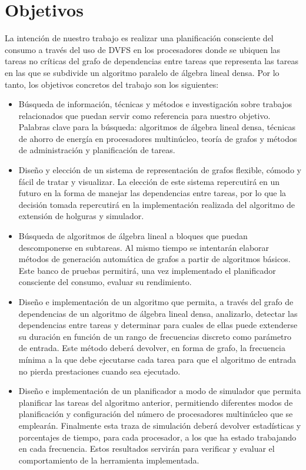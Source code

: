 \section{Objetivos}

La intención de nuestro trabajo es realizar una planificación consciente del consumo
a través del uso de DVFS en los procesadores donde se ubiquen las tareas no 
críticas del grafo de dependencias entre tareas que representa las tareas en las 
que se subdivide un algoritmo paralelo de álgebra lineal densa. Por lo tanto, los objetivos concretos del trabajo 
son los siguientes:

\begin{itemize}

\item Búsqueda de información, técnicas y métodos e investigación sobre trabajos relacionados
que puedan servir como referencia para nuestro objetivo. Palabras clave para la búsqueda: 
algoritmos de álgebra lineal densa, técnicas de ahorro de energía en procesadores multinúcleo, teoría de grafos y
métodos de administración y planificación de tareas.

\item Diseño y elección de un sistema de representación de grafos flexible, cómodo y fácil
de tratar y visualizar. La elección de este sistema repercutirá en un futuro en la forma
de manejar las dependencias entre tareas, por lo que la decisión tomada repercutirá
en la implementación realizada del algoritmo de extensión de holguras y simulador.

\item Búsqueda de algoritmos de álgebra lineal a bloques que puedan descomponerse
en subtareas. Al mismo tiempo se intentarán elaborar métodos de generación automática
de grafos a partir de algoritmos básicos. Este banco de pruebas permitirá, una vez implementado el
planificador consciente del consumo, evaluar su rendimiento.

\item Diseño e implementación de un algoritmo que permita, a través del grafo de dependencias de
un algoritmo de álgebra lineal densa, analizarlo, detectar las dependencias entre
tareas y determinar para cuales de ellas puede extenderse su duración en función de un
rango de frecuencias discreto como parámetro de entrada. Este método
deberá devolver, en forma de grafo, la frecuencia mínima a la que debe ejecutarse cada tarea 
para que el algoritmo de entrada no pierda prestaciones cuando sea ejecutado.

\item Diseño e implementación de un planificador a modo de simulador que permita
planificar las tareas del algoritmo anterior, permitiendo diferentes modos de planificación
y configuración del número de procesadores multinúcleo que se emplearán. Finalmente
esta traza de simulación deberá devolver estadísticas y porcentajes de tiempo, para cada 
procesador, a los que ha estado trabajando en cada frecuencia. Estos resultados
servirán para verificar y evaluar el comportamiento de la herramienta implementada.


\end{itemize}

